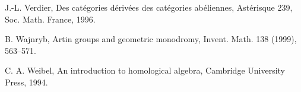 \begin{list}{}{\setlength{\leftmargin}{3em}\setlength{\labelwidth}{2.5em}\setlength{\itemsep}{.5em}\small}
\item[\hypertarget{bib:141}{[141]}] J.-L. Verdier, Des catégories dérivées des catégories abéliennes, Astérisque 239, Soc. Math. France, 1996. 
\item[\hypertarget{bib:142}{[142]}] B. Wajnryb, Artin groups and geometric monodromy, Invent. Math. 138 (1999), 563–571. 
\item[\hypertarget{bib:143}{[143]}] C. A. Weibel, An introduction to homological algebra, Cambridge University Press, 1994. 
\end{list}
